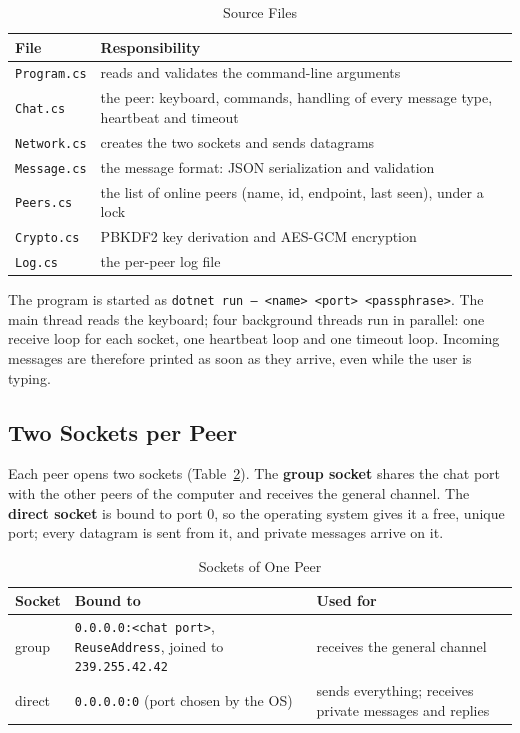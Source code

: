 \documentclass[11pt, a4paper]{article}
\begin{document}
\begin{table}[h]
\centering
\caption{Source Files}
\label{tab:files}
\begin{tabularx}{\textwidth}{@{}lX@{}}
\toprule
\textbf{File} & \textbf{Responsibility} \\ \midrule
\texttt{Program.cs} & reads and validates the command-line arguments \\
\texttt{Chat.cs} & the peer: keyboard, commands, handling of every message type, heartbeat and timeout \\
\texttt{Network.cs} & creates the two sockets and sends datagrams \\
\texttt{Message.cs} & the message format: JSON serialization and validation \\
\texttt{Peers.cs} & the list of online peers (name, id, endpoint, last seen), under a lock \\
\texttt{Crypto.cs} & PBKDF2 key derivation and AES-GCM encryption \\
\texttt{Log.cs} & the per-peer log file \\ \bottomrule
\end{tabularx}
\end{table}

The program is started as \texttt{dotnet run -- <name> <port> <passphrase>}. The main thread reads the keyboard; four background threads run in parallel: one receive loop for each socket, one heartbeat loop and one timeout loop. Incoming messages are therefore printed as soon as they arrive, even while the user is typing.

\subsection{Two Sockets per Peer}
Each peer opens two sockets (Table~\ref{tab:sockets}). The \textbf{group socket} shares the chat port with the other peers of the computer and receives the general channel. The \textbf{direct socket} is bound to port 0, so the operating system gives it a free, unique port; every datagram is sent from it, and private messages arrive on it.

\begin{table}[h]
\centering
\caption{Sockets of One Peer}
\label{tab:sockets}
\begin{tabularx}{\textwidth}{@{}llX@{}}
\toprule
\textbf{Socket} & \textbf{Bound to} & \textbf{Used for} \\ \midrule
group & \texttt{0.0.0.0:<chat port>}, \texttt{ReuseAddress}, joined to \texttt{239.255.42.42} & receives the general channel \\
direct & \texttt{0.0.0.0:0} (port chosen by the OS) & sends everything; receives private messages and replies \\ \bottomrule
\end{tabularx}
\end{table}
\end{document}
